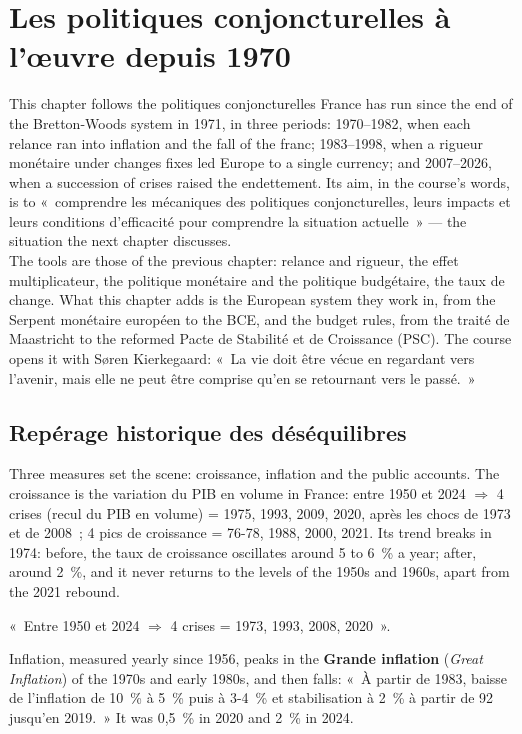 \section{Les politiques conjoncturelles à l'œuvre depuis 1970}

This chapter follows the politiques conjoncturelles France has run since the end of
the Bretton-Woods system in 1971, in three periods: 1970--1982, when each
relance ran into inflation and the fall of the franc; 1983--1998, when a rigueur
monétaire under changes fixes led Europe to a single currency; and 2007--2026, when a
succession of crises raised the endettement. Its aim, in the course's words, is to
«~comprendre les mécaniques des politiques conjoncturelles, leurs impacts et leurs
conditions d'efficacité pour comprendre la situation actuelle~» --- the situation the
next chapter discusses.\\

The tools are those of the previous chapter: relance and rigueur, the effet
multiplicateur, the politique monétaire and the politique budgétaire, the taux de
change. What this chapter adds is the European system they work in, from the Serpent
monétaire européen to the BCE, and the budget rules, from the traité de Maastricht to
the reformed Pacte de Stabilité et de Croissance (PSC). The course opens it with Søren Kierkegaard: «~La vie doit être vécue
en regardant vers l'avenir, mais elle ne peut être comprise qu'en se retournant vers le
passé.~»

\subsection{Repérage historique des déséquilibres}

Three measures set the scene: croissance, inflation and the public accounts. The
croissance is the variation du PIB en volume in France: entre 1950 et 2024
$\Rightarrow$ 4 crises (recul du PIB en volume) = 1975, 1993, 2009, 2020, après les
chocs de 1973 et de 2008~; 4 pics de croissance = 76-78, 1988, 2000, 2021. Its trend breaks in 1974: before, the taux de croissance oscillates around 5 to 6~\% a year;
after, around 2~\%, and it never returns to the levels of the 1950s and 1960s, apart
from the 2021 rebound.

\begin{remark}
  «~Entre 1950 et 2024 $\Rightarrow$ 4 crises = 1973, 1993, 2008, 2020~».
\end{remark}

Inflation, measured yearly since 1956, peaks in the \textbf{Grande inflation}
(\textit{Great Inflation}) of the 1970s and early 1980s, and then falls: «~À partir de
1983, baisse de l'inflation de 10~\% à 5~\% puis à 3-4~\% et stabilisation à 2~\% à
partir de 92 jusqu'en 2019.~» It was 0,5~\% in 2020 and 2~\% in 2024.\\

